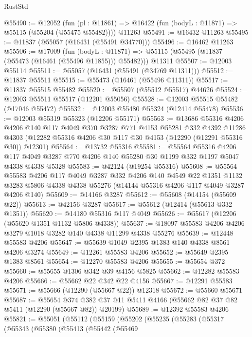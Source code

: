 \begin{lexlean}{RustStd}
\begin{coremodule}
@55490 := @12052
    (fun (pl : @11861) => @16422 (fun (bodyL : @11871) => @55115 (@55204 (@55475 @55482))))
    @11263
@55491 := @16432 @11263
@55495 := @11837 (@55057 (@16431 (@55491 @34770)))
@55496 := @16462 @11263
@55506 := @17009
    (fun (bodyL : @11871) => @55115 (@55495 (@11837 (@55473 (@16461 (@55496 @11855))) @55482)))
    @11311
@55507 := @12003 @55114
@55511 := @55057 (@16431 (@55491 (@34769 @11311)))
@55512 := @11837 @55511
@55515 := @55473 (@16461 (@55496 @11311))
@55517 := @11837 @55515 @55482
@55520 := @55507 (@55512 @55517) @44626
@55524 := @12003 @55511 @55517 (@12201 @55056)
@55528 := @12003 @55515 @55482 (@17046 @55472)
@55532 := @12003 @55480 @55324 (@12414 @55478)
@55536 := @12003 @55319 @55323 (@12206 @55171)
@55563 := @13686
    @55316
    @4206
    @4206
    @140
    @117
    @4049
    @370
    @3287
    @771
    @4153
    @55281
    @332
    @4392
    @11286
    @4303
    (@12282 @55316 @4206 @30 @117 @30 @4153 (@12290 (@12291 @55316 @30)) @12301)
@55564 := @13732 @55316
@55581 := @55564
    @55316
    @4206
    @117
    @4049
    @3287
    @770
    @4206
    @140
    @55280
    @30
    @1199
    @332
    @1197
    @5047
    @4338
    @4338
    @5328
@55583 := @42124 (@19254 @55316)
@55608 := @55564
    @55583
    @4206
    @117
    @4049
    @3287
    @332
    @4206
    @140
    @4549
    @22
    @1351
    @1132
    @3283
    @5806
    @4338
    @4338
    @55276
    (@14144 @55316 @4206 @117 @4049 @3287 @4206 @140)
@55609 := @14166 @3287
@55612 := @55608 (@14154 (@55609 @22))
@55613 := @42156 @3287
@55617 := @55612 (@12414 (@55613 @332 @1351))
@55620 := @14180 @55316 @117 @4049
@55626 := @55617 (@12206 (@55620 @1351 @1132 @5806 @4338))
@55637 := @18097 @55583 @4206 @4206 @3279 @1018 @3282 @140 @4338 @11299 @4338 @55276
@55639 := @12448 @55583 @4206
@55647 := @55639 @1049 @2395 @1383 @140 @4338 @8561 @4206 @3274
@55649 := @12261 @55583 @4206
@55652 := @55649 @2395 @1383 @8561
@55654 := @12270 @55583 @4206
@55655 := @55654 @372
@55660 := @55655 @1306 @342 @39 @4156 @5825
@55662 := @12282 @55583 @4206
@55666 := @55662 @22 @342 @22 @4156
@55667 := @12291 @55583
@55671 := @55666 (@12290 (@55667 @22)) @12318
@55672 := @55660 @55671
@55687 := @55654
    @374
    @382
    @37
    @11
    @5411
    @4166
    (@55662 @82 @37 @82 @5411 (@12290 (@55667 @82)) @20199)
@55689 := @12392 @55583 @4206
@55821 := @55051
    (@55112
      (@55159
        (@55202
          (@55235
            (@55283
              (@55317
                (@55343
                  (@55380
                    (@55413
                      (@55442
                        (@55469

\end{coremodule}
\end{lexlean}
